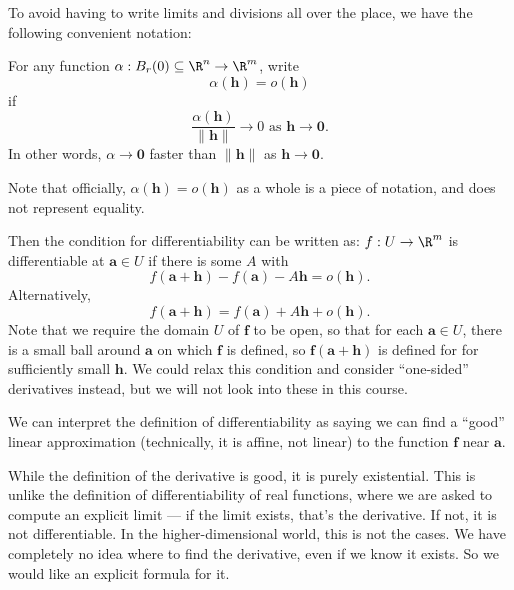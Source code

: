 \documentclass[a4paper]{article}
\begin{document}
To avoid having to write limits and divisions all over the place, we have the following convenient notation:
\begin{notation}
  For any function $\alpha: B_r(0) \subseteq \R^n \to \R^m$, write
  \[
    \alpha(\mathbf{h}) = o(\mathbf{h})
  \]
  if
  \[
    \frac{\alpha(\mathbf{h})}{\|\mathbf{h}\|} \to 0\text{ as }\mathbf{h}\to \mathbf{0}.
  \]
  In other words, $\alpha\to \mathbf{0}$ faster than $\|\mathbf{h}\|$ as $\mathbf{h}\to \mathbf{0}$.

  Note that officially, $\alpha(\mathbf{h}) = o(\mathbf{h})$ as a whole is a piece of notation, and does not represent equality.
\end{notation}
Then the condition for differentiability can be written as: $f: U \to \R^m$ is differentiable at $\mathbf{a} \in U$ if there is some $A$ with
\[
  f(\mathbf{a} + \mathbf{h}) - f(\mathbf{a}) - A\mathbf{h} = o(\mathbf{h}).
\]
Alternatively,
\[
  f(\mathbf{a} + \mathbf{h}) = f(\mathbf{a}) + A\mathbf{h} + o(\mathbf{h}).
\]
Note that we require the domain $U$ of $\mathbf{f}$ to be open, so that for each $\mathbf{a} \in U$, there is a small ball around $\mathbf{a}$ on which $\mathbf{f}$ is defined, so $\mathbf{f}(\mathbf{a} + \mathbf{h})$ is defined for for sufficiently small $\mathbf{h}$. We could relax this condition and consider ``one-sided'' derivatives instead, but we will not look into these in this course.

We can interpret the definition of differentiability as saying we can find a ``good'' linear approximation (technically, it is affine, not linear) to the function $\mathbf{f}$ near $\mathbf{a}$.

While the definition of the derivative is good, it is purely existential. This is unlike the definition of differentiability of real functions, where we are asked to compute an explicit limit --- if the limit exists, that's the derivative. If not, it is not differentiable. In the higher-dimensional world, this is not the cases. We have completely no idea where to find the derivative, even if we know it exists. So we would like an explicit formula for it.
\end{document}
